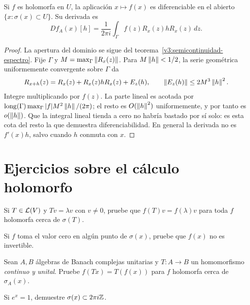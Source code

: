 \begin{proposicion}\label{v3:derivada-calculo}
Si $f$ es holomorfa en $U$, la aplicación $x\mapsto f(x)$ es diferenciable en el abierto $\{x:\sigma(x)\subset U\}$. Su derivada es
\[
 Df_A(x)[h]=\frac1{2\pi i}\int_\Gamma f(z)R_x(z)hR_x(z)\,dz.
\]
\end{proposicion}
\begin{proof}
La apertura del dominio se sigue del teorema~\ref{v3:semicontinuidad-espectro}. Fije $\Gamma$ y $M=\max_\Gamma\left\lVert R_x(z)\right\rVert$. Para $M\left\lVert h\right\rVert<1/2$, la serie geométrica uniformemente convergente sobre $\Gamma$ da
\[
 R_{x+h}(z)=R_x(z)+R_x(z)hR_x(z)+E_z(h),
 \qquad \left\lVert E_z(h)\right\rVert\le2M^3\left\lVert h\right\rVert^2.
\]
Integre multiplicando por $f(z)$. La parte lineal es acotada por
$\operatorname{long}(\Gamma)\max_\Gamma|f|M^2\left\lVert h\right\rVert/(2\pi)$; el resto es $O(\left\lVert h\right\rVert^2)$ uniformemente, y por tanto es $o(\left\lVert h\right\rVert)$. Que la integral lineal tienda a cero no habría bastado por sí solo: es esta cota del resto la que demuestra diferenciabilidad. En general la derivada no es $f'(x)h$, salvo cuando $h$ conmuta con $x$.
\end{proof}

\section{Ejercicios sobre el cálculo holomorfo}

\begin{ejercicio}\label{ej:v3-l23-1}
Si $T\in\mathcal L(V)$ y $Tv=\lambda v$ con $v\ne0$, pruebe que $f(T)v=f(\lambda)v$ para toda $f$ holomorfa cerca de $\sigma(T)$.
\end{ejercicio}


\begin{ejercicio}\label{ej:v3-l23-2}
Si $f$ toma el valor cero en algún punto de $\sigma(x)$, pruebe que $f(x)$ no es invertible.
\end{ejercicio}


\begin{ejercicio}\label{ej:v3-l23-3}
Sean $A,B$ álgebras de Banach complejas unitarias y $T:A\to B$ un homomorfismo \emph{continuo y unital}. Pruebe $f(Tx)=T(f(x))$ para $f$ holomorfa cerca de $\sigma_A(x)$.
\end{ejercicio}


\begin{ejercicio}\label{ej:v3-l23-4}
Si $e^x=1$, demuestre $\sigma(x)\subset2\pi i\mathbb Z$.
\end{ejercicio}


